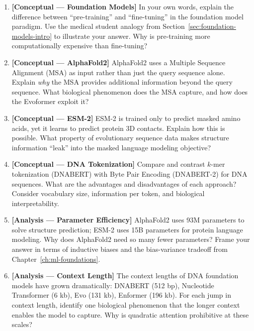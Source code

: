 \begin{enumerate}[label=\textbf{6.\arabic*.}, leftmargin=2.5em]

\item \textbf{[Conceptual --- Foundation Models]} In your own words, explain the difference between ``pre-training'' and ``fine-tuning'' in the foundation model paradigm. Use the medical student analogy from Section~\ref{sec:foundation-models-intro} to illustrate your answer. Why is pre-training more computationally expensive than fine-tuning?

\item \textbf{[Conceptual --- AlphaFold2]} AlphaFold2 uses a Multiple Sequence Alignment (MSA) as input rather than just the query sequence alone. Explain \emph{why} the MSA provides additional information beyond the query sequence. What biological phenomenon does the MSA capture, and how does the Evoformer exploit it?

\item \textbf{[Conceptual --- ESM-2]} ESM-2 is trained only to predict masked amino acids, yet it learns to predict protein 3D contacts. Explain how this is possible. What property of evolutionary sequence data makes structure information ``leak'' into the masked language modeling objective?

\item \textbf{[Conceptual --- DNA Tokenization]} Compare and contrast $k$-mer tokenization (DNABERT) with Byte Pair Encoding (DNABERT-2) for DNA sequences. What are the advantages and disadvantages of each approach? Consider vocabulary size, information per token, and biological interpretability.

\item \textbf{[Analysis --- Parameter Efficiency]} AlphaFold2 uses 93M parameters to solve structure prediction; ESM-2 uses 15B parameters for protein language modeling. Why does AlphaFold2 need so many fewer parameters? Frame your answer in terms of inductive biases and the bias-variance tradeoff from Chapter~\ref{ch:ml-foundations}.

\item \textbf{[Analysis --- Context Length]} The context lengths of DNA foundation models have grown dramatically: DNABERT (512 bp), Nucleotide Transformer (6 kb), Evo (131 kb), Enformer (196 kb). For each jump in context length, identify one biological phenomenon that the longer context enables the model to capture. Why is quadratic attention prohibitive at these scales?


\end{enumerate}
